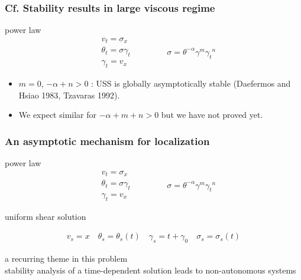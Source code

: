 \documentclass{beamer}
\def\blue{\color{blue}}
\begin{document}
\begin{frame}
 \frametitle{Cf. Stability results in large viscous regime}
{\color{cyan} power law }
\begin{equation*}
  \begin{aligned}
    & v_{t} =  \sigma_{x}
    \\
    & \theta_{t} =   \sigma \gamma_{t}
     \\
    & \gamma_{t} = v_{x}
  \end{aligned}
  \qquad \qquad
  \sigma = \theta^{-\alpha} \gamma^m {\gamma_t}^n
\end{equation*}
 \begin{itemize}
  \item $m=0$, $-\alpha+n>0$ :  USS is globally asymptotically stable {\footnotesize (Daefermos and Hsiao 1983, Tzavaras 1992)}.
  \item {\blue We expect similar for $-\alpha+m+n>0$ but we have not proved yet.}
 \end{itemize}

  
  \vfill
\end{frame}

\begin{frame}\frametitle{An asymptotic mechanism for localization}
{\color{cyan} power law }
\begin{equation*}
  \begin{aligned}
    & v_{t} =  \sigma_{x}
    \\
    & \theta_{t} =   \sigma \gamma_{t}
     \\
    & \gamma_{t} = v_{x}
  \end{aligned}
  \qquad \qquad
  \sigma = \theta^{-\alpha} \gamma^m {\gamma_t}^n
\end{equation*}


{\color{blue} uniform shear solution }

\begin{equation*}
  \begin{aligned}
  v_s = x \quad \theta_s = \theta_s (t) \quad \gamma_s = t + \gamma_0 \quad \sigma_s = \sigma_s (t)
  \end{aligned}
   \end{equation*}
   

{\color{red} a recurring theme in this problem} \\
stability analysis of a time-dependent solution leads to non-autonomous systems



\end{frame}
\end{document}
